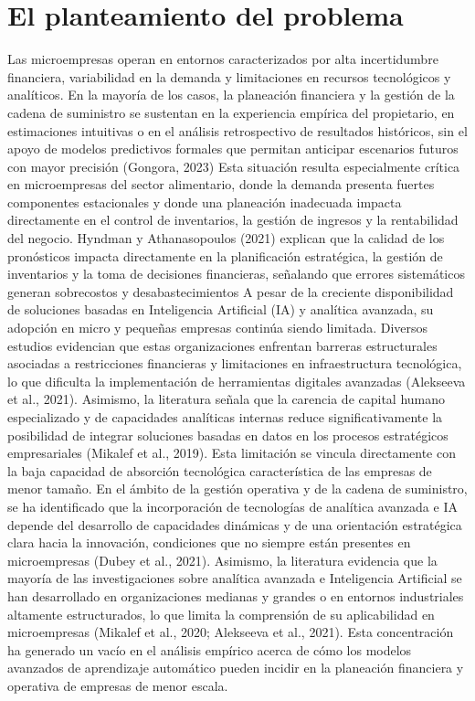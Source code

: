\documentclass[12pt]{book}
\begin{document}
\chapter{El planteamiento del problema}
Las microempresas operan en entornos caracterizados por alta incertidumbre financiera, variabilidad en la demanda y limitaciones en recursos tecnológicos y analíticos. En la mayoría de los casos, la planeación financiera y la gestión de la cadena de suministro se sustentan en la experiencia empírica del propietario, en estimaciones intuitivas o en el análisis retrospectivo de resultados históricos, sin el apoyo de modelos predictivos formales que permitan anticipar escenarios futuros con mayor precisión (Gongora, 2023)
Esta situación resulta especialmente crítica en microempresas del sector alimentario, donde la demanda presenta fuertes componentes estacionales y donde una planeación inadecuada impacta directamente en el control de inventarios, la gestión de ingresos y la rentabilidad del negocio. Hyndman y Athanasopoulos (2021) explican que la calidad de los pronósticos impacta directamente en la planificación estratégica, la gestión de inventarios y la toma de decisiones financieras, señalando que errores sistemáticos generan sobrecostos y desabastecimientos
A pesar de la creciente disponibilidad de soluciones basadas en Inteligencia Artificial (IA) y analítica avanzada, su adopción en micro y pequeñas empresas continúa siendo limitada. Diversos estudios evidencian que estas organizaciones enfrentan barreras estructurales asociadas a restricciones financieras y limitaciones en infraestructura tecnológica, lo que dificulta la implementación de herramientas digitales avanzadas (Alekseeva et al., 2021).
Asimismo, la literatura señala que la carencia de capital humano especializado y de capacidades analíticas internas reduce significativamente la posibilidad de integrar soluciones basadas en datos en los procesos estratégicos empresariales (Mikalef et al., 2019). Esta limitación se vincula directamente con la baja capacidad de absorción tecnológica característica de las empresas de menor tamaño.
En el ámbito de la gestión operativa y de la cadena de suministro, se ha identificado que la incorporación de tecnologías de analítica avanzada e IA depende del desarrollo de capacidades dinámicas y de una orientación estratégica clara hacia la innovación, condiciones que no siempre están presentes en microempresas (Dubey et al., 2021).
Asimismo, la literatura evidencia que la mayoría de las investigaciones sobre analítica avanzada e Inteligencia Artificial se han desarrollado en organizaciones medianas y grandes o en entornos industriales altamente estructurados, lo que limita la comprensión de su aplicabilidad en microempresas (Mikalef et al., 2020; Alekseeva et al., 2021). Esta concentración ha generado un vacío en el análisis empírico acerca de cómo los modelos avanzados de aprendizaje automático pueden incidir en la planeación financiera y operativa de empresas de menor escala.
\end{document}
